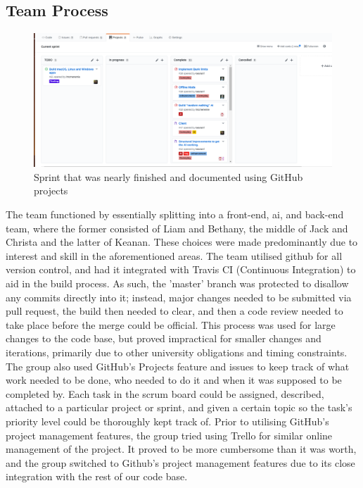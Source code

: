 \documentclass[a4paper,doc,draftfirst]{apa6}
\begin{document}
\subsection{Team Process}
\begin{figure}[hbtp]
\includegraphics[width=\textwidth]{githubProjects}
\caption{Sprint that was nearly finished and documented using GitHub projects}
\end{figure}
The team functioned by essentially splitting into a front-end, ai, and back-end team, where the former consisted of Liam and Bethany, the middle of Jack and Christa and the latter of Keanan. These choices were made predominantly due to interest and skill in the aforementioned areas. The team utilised github for all version control, and had it integrated with Travis CI (Continuous Integration) to aid in the build process. As such, the 'master' branch was protected to disallow any commits directly into it; instead, major changes needed to be submitted via pull request, the build then needed to clear, and then a code review needed to take place before the merge could be official. This process was used for large changes to the code base, but proved impractical for smaller changes and iterations, primarily due to other university obligations and timing constraints. The group also used GitHub's Projects feature and issues to keep track of what work needed to be done, who needed to do it and when it was supposed to be completed by. Each task in the scrum board could be assigned, described, attached to a particular project or sprint, and given a certain topic so the task's priority level could be thoroughly kept track of. Prior to utilising GitHub's project management features, the group tried using Trello for similar online management of the project. It proved to be more cumbersome than it was worth, and the group switched to Github's project management features due to its close integration with the rest of our code base.
\end{document}
